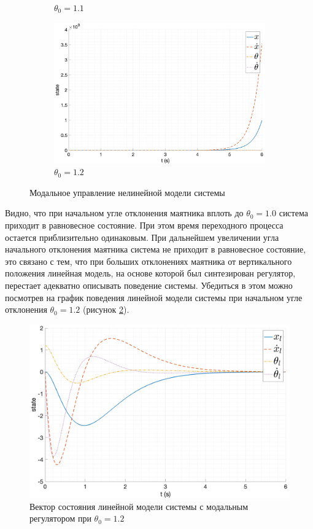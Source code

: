 \begin{figure}[ht!]
\begin{subfigure}[b]{0.45\textwidth}
        \caption{$\theta_0 = 1.1$}
    \end{subfigure}
    \begin{subfigure}[b]{0.45\textwidth}
        \includegraphics[width=\textwidth]{media/plots/modal_control/state_6.png}
        \caption{$\theta_0 = 1.2$}
    \end{subfigure}
    \caption{Модальное управление нелинейной модели системы}
    \label{fig:modal_control_initials}
\end{figure}
Видно, что при начальном угле отклонения маятника вплоть до $\theta_0 = 1.0$ система приходит в
равновесное состояние. При этом время переходного процесса остается приблизительно одинаковым. 
При дальнейшем увеличении угла начального отклонения маятника система не приходит в равновесное состояние, 
это связано с тем, что при больших отклонениях маятника от вертикального положения линейная модель, на основе 
которой был синтезирован регулятор, перестает адекватно описывать поведение системы. Убедиться в этом можно 
посмотрев на график поведения линейной модели системы при начальном угле отклонения $\theta_0 = 1.2$ (рисунок \ref{fig:modal_control_linear_out_6}).
\begin{figure}[ht!]
    \centering
    \includegraphics[width=\textwidth]{media/plots/modal_control/state_lin_6.png}
    \caption{Вектор состояния линейной модели системы с модальным регулятором при $\theta_0 = 1.2$}
    \label{fig:modal_control_linear_out_6}
\end{figure}
